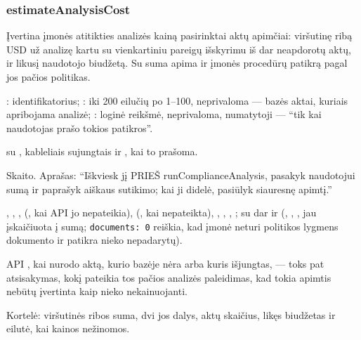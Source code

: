 \subsubsection{estimateAnalysisCost}\label{sec:tools:estimateAnalysisCost}
\begin{description}[style=multiline, leftmargin=19mm, labelwidth=17mm, labelsep=2mm,
  font=\sffamily\bfseries\footnotesize\color{ink}, itemsep=1pt, topsep=2pt, before=\raggedright]
  \item[Paskirtis] Įvertina įmonės atitikties analizės kainą pasirinktai aktų apimčiai:
    viršutinę ribą USD už analizę kartu su vienkartiniu pareigų išskyrimu iš dar neapdorotų
    aktų, ir likusį naudotojo biudžetą. Su  suma apima ir įmonės
    procedūrų patikrą pagal jos pačios politikas.
  \item[Įvestis] : identifikatorius; : iki 200 eilučių po
    1--100, neprivaloma --- bazės aktai, kuriais apribojama analizė;
    : loginė reikšmė, neprivaloma, numatytoji  ---
    \enquote{tik kai naudotojas prašo tokios patikros}.
  \item[Užklausos]  su , kableliais
    sujungtais  ir , kai to prašoma.
  \item[Pobūdis] Skaito. Aprašas: \enquote{Iškviesk jį PRIEŠ runComplianceAnalysis, pasakyk
    naudotojui sumą ir paprašyk aiškaus sutikimo; kai ji didelė, pasiūlyk siauresnę apimtį.}
  \item[Grąžina] , , ,
     (, kai API jo nepateikia),  (,
    kai nepateikta), , , , ; su
     dar ir  (,
    , , jau įskaičiuota į sumą; \texttt{documents: 0} reiškia, kad
    įmonė neturi politikos lygmens dokumento ir patikra nieko nepadarytų).
  \item[Klaidos] API , kai  nurodo aktą, kurio bazėje nėra
    arba kuris išjungtas, --- toks pat atsisakymas, kokį pateikia tos pačios analizės
    paleidimas, kad tokia apimtis nebūtų įvertinta kaip nieko nekainuojanti.
  \item[Konsolė] Kortelė: viršutinės ribos suma, dvi jos dalys, aktų skaičius, likęs
    biudžetas ir eilutė, kai kainos nežinomos.
\end{description}

